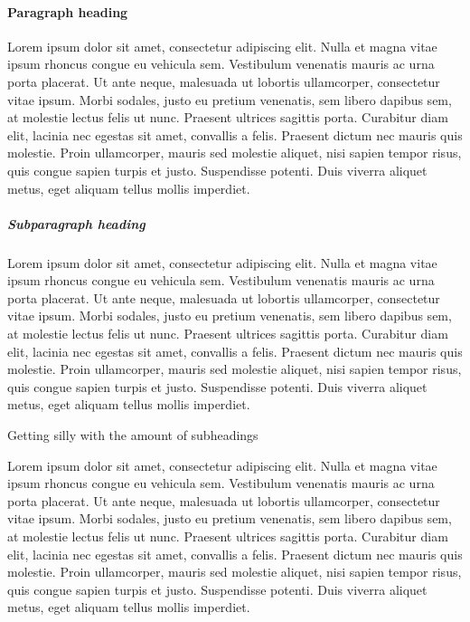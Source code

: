 \documentclass[man,longtable,noextraspace,floatsintext]{apa6}
\begin{document}
\hypertarget{paragraph-heading}{%
\paragraph{Paragraph heading}\label{paragraph-heading}}

Lorem ipsum dolor sit amet, consectetur adipiscing elit. Nulla et magna
vitae ipsum rhoncus congue eu vehicula sem. Vestibulum venenatis mauris
ac urna porta placerat. Ut ante neque, malesuada ut lobortis
ullamcorper, consectetur vitae ipsum. Morbi sodales, justo eu pretium
venenatis, sem libero dapibus sem, at molestie lectus felis ut nunc.
Praesent ultrices sagittis porta. Curabitur diam elit, lacinia nec
egestas sit amet, convallis a felis. Praesent dictum nec mauris quis
molestie. Proin ullamcorper, mauris sed molestie aliquet, nisi sapien
tempor risus, quis congue sapien turpis et justo. Suspendisse potenti.
Duis viverra aliquet metus, eget aliquam tellus mollis imperdiet.

\hypertarget{subparagraph-heading}{%
\subparagraph{Subparagraph heading}\label{subparagraph-heading}}

Lorem ipsum dolor sit amet, consectetur adipiscing elit. Nulla et magna
vitae ipsum rhoncus congue eu vehicula sem. Vestibulum venenatis mauris
ac urna porta placerat. Ut ante neque, malesuada ut lobortis
ullamcorper, consectetur vitae ipsum. Morbi sodales, justo eu pretium
venenatis, sem libero dapibus sem, at molestie lectus felis ut nunc.
Praesent ultrices sagittis porta. Curabitur diam elit, lacinia nec
egestas sit amet, convallis a felis. Praesent dictum nec mauris quis
molestie. Proin ullamcorper, mauris sed molestie aliquet, nisi sapien
tempor risus, quis congue sapien turpis et justo. Suspendisse potenti.
Duis viverra aliquet metus, eget aliquam tellus mollis imperdiet.

Getting silly with the amount of subheadings

Lorem ipsum dolor sit amet, consectetur adipiscing elit. Nulla et magna
vitae ipsum rhoncus congue eu vehicula sem. Vestibulum venenatis mauris
ac urna porta placerat. Ut ante neque, malesuada ut lobortis
ullamcorper, consectetur vitae ipsum. Morbi sodales, justo eu pretium
venenatis, sem libero dapibus sem, at molestie lectus felis ut nunc.
Praesent ultrices sagittis porta. Curabitur diam elit, lacinia nec
egestas sit amet, convallis a felis. Praesent dictum nec mauris quis
molestie. Proin ullamcorper, mauris sed molestie aliquet, nisi sapien
tempor risus, quis congue sapien turpis et justo. Suspendisse potenti.
Duis viverra aliquet metus, eget aliquam tellus mollis imperdiet.
\end{document}

